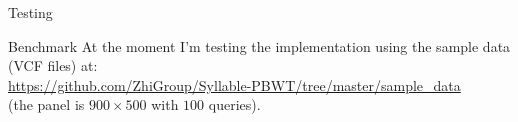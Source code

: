 \documentclass{beamer}
\begin{document}
\begin{frame}{Testing}
  \begin{block}{Benchmark}
    At the moment I'm testing the implementation using the sample data (VCF
    files) at:\\
    \small{\color{nordred}
      \url{https://github.com/ZhiGroup/Syllable-PBWT/tree/master/sample_data}}\\
    (the panel is $900\times 500$ with $100$ queries). 
  \end{block}
\end{frame}
\end{document}
